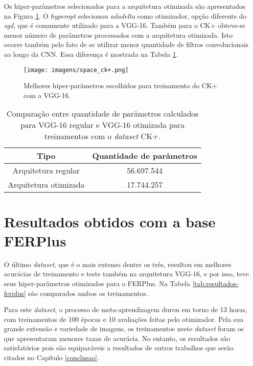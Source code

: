 \documentclass[
12pt,       %
openright,      %
oneside,      %
a4paper,      %
english,      %
french,       %
spanish,      %
brazil        %
]{abntex2}
\begin{document}
Os hiper-parâmetros selecionados para a arquitetura otimizada são apresentados na Figura \ref{fig:space_ck+}. O \textit{hyperopt} selecionou \textit{adadelta} como otimizador, opção diferente do \textit{sgd}, que é comumente utilizado para a VGG-16. Também para o CK+ obteve-se menor número de parâmetros processados com a arquitetura otimizada. Isto ocorre também pelo fato de se utilizar menor quantidade de filtros convolucionais ao longo da CNN. Essa diferença é mostrada na Tabela \ref{tab:comparacao-parametros-vgg16-ck+}.

\begin{figure}[H]
\centering
\caption{Melhores hiper-parâmetros escolhidos para treinamento do CK+ com a VGG-16.}
\texttt{[image: imagens/space\_ck+.png]}
\label{fig:space_ck+}
\end{figure}

\begin{table}[H]
\centering
\caption{Comparação entre quantidade de parâmetros calculados para VGG-16 regular e VGG-16 otimizada para treinamentos com o \textit{dataset} CK+.}
\label{tab:comparacao-parametros-vgg16-ck+}
\begin{tabular}{@{}cc@{}}
\toprule
\textbf{Tipo}         & \textbf{Quantidade de parâmetros} \\ \midrule
Arquitetura regular   & 56.697.544                         \\
Arquitetura otimizada & 17.744.257                        \\ \bottomrule
\end{tabular}
\end{table}

\section{Resultados obtidos com a base FERPlus} \label{resultados-ferplus}

O último \textit{dataset}, que é o mais extenso dentre os três, resultou em melhores acurácias de treinamento e teste também na arquitetura VGG-16, e por isso, teve seus hiper-parâmetros otimizados para o FERPlus. Na Tabela \ref{tab:resultados-ferplus} são comparados ambos os treinamentos.

Para este \textit{dataset}, o processo de meta-aprendizagem durou em torno de 13 horas, com treinamentos de 100 épocas e 10 avaliações feitas pelo otimizador. Pela sua grande extensão e variedade de imagens, os treinamentos neste \textit{dataset} foram os que apresentaram menores taxas de acurácia. No entanto, os resultados são satisfatórios pois são equiparáveis a resultados de outros trabalhos que serão citados no Capítulo \ref{conclusao}.
\end{document}
